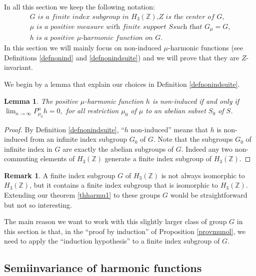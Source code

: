 \documentclass[11pt]{article}
\numberwithin{equation}{section}
\newtheorem{Lem}[Thm]{Lemma}
\theoremstyle{definition}
\newtheorem{Rem}[Thm]{Remark}
\newcommand{\m}[1]{\mathbb{ #1}}
\let\ra\to
\begin{document}
In all this section we keep the following notation:
\begin{equation}
\label{eqnnotsta}
\begin{array}{l}
\textit{$G$ is a finite index subgroup in $H_3(\m Z)$,
$Z$ is the center of $G$,}\\
\textit{$\mu$ is a positive measure with finite support $S$
such that $G_\mu=G$,}\\
\textit{$h$ is a positive $\mu$-harmonic function on $G$.}
\end{array}
\end{equation}
In this section we will mainly focus on non-induced $\mu$-harmonic functions
(see Definitions \ref{defnonind} and \ref{defnonindsuite})
and we will prove that they are $Z$-invariant.

We begin by a lemma that explain our choices in Definition \ref{defnonindsuite}.

\begin{Lem}
\label{lemnonind}
The positive $\mu$-harmonic function $h$ is non-induced if and only if
$\lim_{n\ra\infty}P_{\mu_0}^nh=0,$
for all restriction $\mu_0$ of $\mu$ to an abelian subset $S_0$ of $S$.
\end{Lem}

\begin{proof} By Definition \ref{defnonindsuite}, ``$h$ non-induced'' means that $h$
is non-induced from an infinite index subgroup $G_0$ of $G$.
Note that the subgroups $G_0$ of infinite index in $G$ are exactly
the abelian subgroups of $G$. Indeed any two non-commuting elements of $H_3(\m Z)$
generate a finite index subgroup of $H_3(\m Z)$.
\end{proof}

\begin{Rem}

A finite index subgroup $G$ of $H_3(\m Z)$
is not always isomorphic to $H_3(\m Z)$,
but it contains a finite index subgroup
that is isomorphic to $H_3(\m Z)$.
Extending our theorem \ref{thharmu1} to these groups $G$
would be straightforward but not so interesting.

The main reason we want to work with this slightly larger class of group $G$
in this section
is that, in the ``proof by induction'' of Proposition \ref{provmunol},
we need to apply
the ``induction hypothesis'' to a finite index subgroup of $G$.
\end{Rem}

\subsection{Semiinvariance of harmonic functions}
\label{secseminv}
\end{document}
